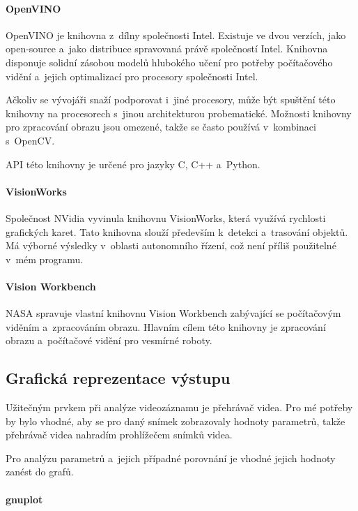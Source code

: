 \paragraph{OpenVINO}

OpenVINO je knihovna z~dílny společnosti Intel. Existuje ve dvou verzích, jako open-source a~jako distribuce spravovaná právě společností Intel. Knihovna disponuje solidní zásobou modelů hlubokého učení pro potřeby počítačového vidění a~jejich optimalizací pro procesory společnosti Intel.

Ačkoliv se vývojáři snaží podporovat i~jiné procesory, může být spuštění této knihovny na procesorech s~jinou architekturou probematické. Možnosti knihovny pro zpracování obrazu jsou omezené, takže se často používá v~kombinaci s~OpenCV.

API této knihovny je určené pro jazyky C, C++ a~Python.

\paragraph{VisionWorks}

Společnost NVidia vyvinula knihovnu VisionWorks, která využívá rychlosti grafických karet. Tato knihovna slouží především k~detekci a~trasování objektů. Má výborné výsledky v~oblasti autonomního řízení, což není příliš použitelné v~mém programu.

\paragraph{Vision Workbench}

NASA spravuje vlastní knihovnu Vision Workbench zabývající se počítačovým viděním a~zpracováním obrazu. Hlavním cílem této knihovny je zpracování obrazu a~počítačové vidění pro vesmírné roboty.



\subsection{Grafická reprezentace výstupu}

Užitečným prvkem při analýze videozáznamu je přehrávač videa. Pro mé potřeby by bylo vhodné, aby se pro daný snímek zobrazovaly hodnoty parametrů, takže přehrávač videa nahradím prohlížečem snímků videa.

Pro analýzu parametrů a~jejich případné porovnání je vhodné jejich hodnoty zanést do grafů.

\paragraph{gnuplot}


